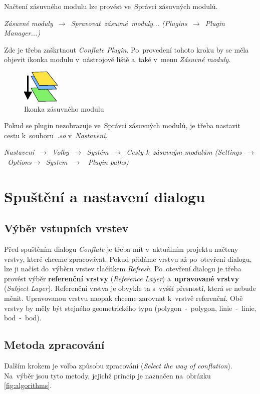 Načtení zásuvného modulu lze provést ve~Správci zásuvných modulů.
\begin{center}
\textit{Zásuvné moduly~$\rightarrow$~Spravovat~zásuvné~moduly... 
(Plugins~$\rightarrow$~Plugin Manager...)}
\end{center}
Zde je třeba zaškrtnout \textit{Conflate Plugin}. Po~provedení tohoto kroku by se 
měla objevit ikonka modulu v~nástrojové liště a~také v~menu \textit{Zásuvné moduly}. 

  \begin{figure}[H]
    \centering
      \includegraphics{./pictures/mActionConflate.pdf}
      \caption{Ikonka zásuvného modulu}
      \label{fig:ikonka}
  \end{figure}

Pokud se plugin nezobrazuje ve~Správci zásuvných modulů, je třeba nastavit cestu 
k~souboru~\textit{.so} v~\textit{Nastavení}.
\begin{center} 
\textit{Nastavení~$\rightarrow$~Volby~$\rightarrow$~Systém~$\rightarrow$~Cesty 
k~zásuvným modulům (Settings~$\rightarrow$~Options$\rightarrow$~System~$\rightarrow$
~Plugin paths)}
\end{center}


\section{Spuštění a nastavení dialogu}
\label{prirucka-spusteni}

\subsection{Výběr vstupních vrstev}
Před spuštěním dialogu \textit{Conflate} je třeba mít v~aktuálním projektu 
načteny vrstvy, které chceme zpracovávat. Pokud přidáme vrstvu až po~otevření
dialogu, lze ji načíst do~výběru vrstev tlačítkem \textit{Refresh}.
Po~otevření dialogu je třeba provést výběr \textbf{re\-ferenční vrstvy} 
(\textit{Reference Layer}) a~\textbf{upravované vrstvy} (\textit{Subject Layer}). 
Re\-ferenční vrstva je obvykle ta s~vyšší přesností, která se nebude měnit. 
Upravovanou vrstvu naopak chceme zarovnat k~vrstvě referenční. 
Obě vrstvy by měly být stejného geometrického typu (polygon~-~polygon, 
linie~-~linie, bod~-~bod).

\subsection{Metoda zpracování}
Dalším krokem je volba způsobu zpracování (\textit{Select the way of conflation}). 
Na~výběr jsou tyto metody, jejichž princip je naznačen na~obrázku \ref{fig:algorithms}.

